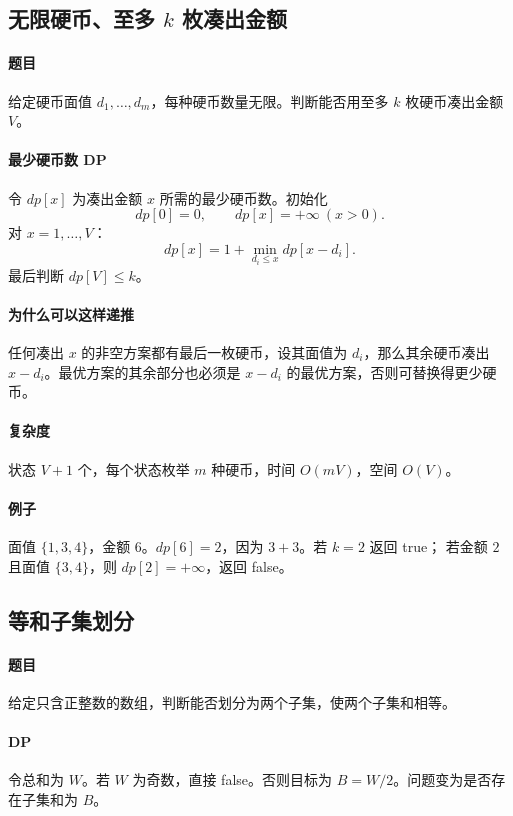 \documentclass[UTF8,openany,12pt]{ctexbook}
\theoremstyle{remark}
\begin{document}
\subsection[无限硬币、至多 k 枚凑出金额]{无限硬币、至多 $k$ 枚凑出金额}

\paragraph{题目}
给定硬币面值 $d_1,\dots,d_m$，每种硬币数量无限。判断能否用至多 $k$ 枚硬币凑出金额
$V$。

\paragraph{最少硬币数 DP}
令 $dp[x]$ 为凑出金额 $x$ 所需的最少硬币数。初始化
\[
  dp[0]=0,\qquad dp[x]=+\infty\ (x>0).
\]
对 $x=1,\dots,V$：
\[
  dp[x]=1+\min_{d_i\le x}dp[x-d_i].
\]
最后判断 $dp[V]\le k$。

\paragraph{为什么可以这样递推}
任何凑出 $x$ 的非空方案都有最后一枚硬币，设其面值为 $d_i$，那么其余硬币凑出
$x-d_i$。最优方案的其余部分也必须是 $x-d_i$ 的最优方案，否则可替换得更少硬币。

\paragraph{复杂度}
状态 $V+1$ 个，每个状态枚举 $m$ 种硬币，时间 $O(mV)$，空间 $O(V)$。

\paragraph{例子}
面值 $\{1,3,4\}$，金额 $6$。$dp[6]=2$，因为 $3+3$。若 $k=2$ 返回 true；
若金额 $2$ 且面值 $\{3,4\}$，则 $dp[2]=+\infty$，返回 false。

\subsection{等和子集划分}

\paragraph{题目}
给定只含正整数的数组，判断能否划分为两个子集，使两个子集和相等。

\paragraph{DP}
令总和为 $W$。若 $W$ 为奇数，直接 false。否则目标为 $B=W/2$。问题变为是否存在子集和为 $B$。
\end{document}
